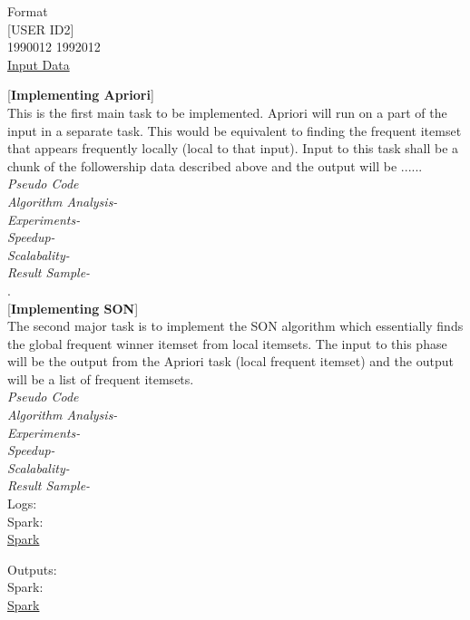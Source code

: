 \documentclass[11pt]{article}
\begin{document}
\begin{center}
Format \\
[ USER ID1 ] \hspace{1cm} [USER ID2] \\
1990012 \hspace{1cm} 1992012 \\

\href{https://wiki.illinois.edu//wiki/display/forward/Dataset-UDI-TwitterCrawl-Aug2012}{ Input Data}

 [{\bf Implementing Apriori}]\\
This is the first main task to be implemented. Apriori will run on a part of the input in a separate task. This would be equivalent to finding the frequent itemset that appears frequently locally (local to that input). Input to this task shall be a chunk of the followership data described above and the output will be ...... \\

\textit {Pseudo Code}\\
\textit {Algorithm Analysis-}\\
\textit {Experiments-}\\
\textit {Speedup-}\\
\textit {Scalabality-}\\
\textit {Result Sample-}\\ .\\
 
 [{\bf Implementing SON}]\\
The second major task is to implement the SON algorithm which essentially finds the global frequent winner itemset from local itemsets. The input to this phase will be the output from the Apriori task (local frequent itemset) and the output will be a list of frequent itemsets.\\
\textit {Pseudo Code}\\
\textit {Algorithm Analysis-}\\
\textit {Experiments-}\\
\textit {Speedup-}\\
\textit {Scalabality-}\\
\textit {Result Sample-}\\

Logs: \\
Spark: \\
\href{https://github.ccs.neu.edu/prdx/CS6240-Project/tree/master/log}{Spark}

Outputs: \\
Spark: \\
\href{https://github.ccs.neu.edu/prdx/CS6240-Project/tree/master/output}{Spark} \\

\end{center}
\end{document}
